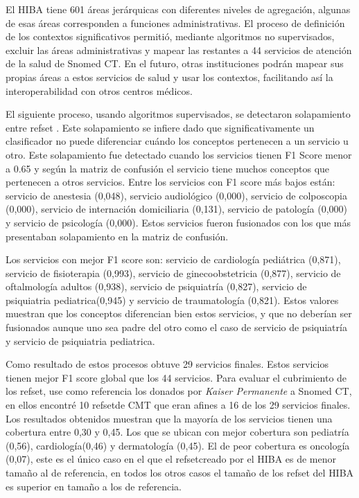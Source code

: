 El \acrshort{HIBA} tiene 601 áreas jerárquicas con diferentes niveles de agregación, algunas de esas áreas corresponden a funciones administrativas. El proceso de definición de los contextos significativos permitió, mediante algoritmos no supervisados,  excluir las áreas administrativas y mapear las restantes a  44 servicios de atención de la salud de Snomed CT. En el futuro, otras instituciones podrán mapear sus propias áreas a estos servicios de salud y usar los contextos, facilitando así la interoperabilidad con otros centros médicos. 

El siguiente proceso, usando algoritmos supervisados, se detectaron solapamiento entre {\acrshort{refset}} . Este solapamiento se infiere dado que significativamente un clasificador no puede diferenciar cuándo los conceptos pertenecen a un servicio u otro. Este solapamiento fue detectado cuando los servicios tienen F1 Score menor a \num{0,65} y según la matriz de confusión el servicio tiene muchos conceptos que pertenecen a otros servicios. Entre los servicios con F1 score más bajos están: servicio de anestesia (0,048), servicio audiológico (0,000), servicio de colposcopia (0,000), servicio de internación domiciliaria (0,131), servicio de patología (0,000) y servicio de psicología (0,000). Estos servicios fueron fusionados con los que más presentaban solapamiento en la matriz de confusión. 

Los servicios con mejor F1 score son: servicio de cardiología pediátrica (0,871), servicio de fisioterapia (0,993), servicio de ginecoobstetricia (0,877), servicio de oftalmología adultos (0,938), servicio de psiquiatría (0,827), servicio de psiquiatria pediatrica(0,945) y  servicio de traumatología (0,821). Estos valores muestran que los conceptos diferencian bien estos servicios, y que no deberían ser fusionados aunque uno sea padre del otro como el caso de  servicio de psiquiatría y servicio de psiquiatria pediatrica.

Como resultado de estos procesos obtuve 29 servicios finales. Estos servicios tienen mejor F1 score global que los 44 servicios. Para evaluar el cubrimiento de los {\acrshort{refset}}, use como referencia los donados por \textit{Kaiser Permanente }a Snomed CT, en ellos encontré 10 {\acrshort{refset}}de \acrshort{CMT} que eran afines a 16 de los 29 servicios finales. Los resultados obtenidos muestran que la mayoría de los servicios tienen una cobertura entre 0,30 y 0,45. Los que se ubican con mejor cobertura son pediatría (0,56), cardiología(0,46) y dermatología (0,45). El de peor cobertura es oncología (0,07), este es el único caso en el que el {\acrshort{refset}}creado por el \acrshort{HIBA} es de menor tamaño al de referencia, en todos los otros casos el tamaño de los {\acrshort{refset}} del \acrshort{HIBA} es superior en tamaño a los de referencia. 

